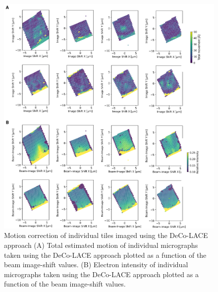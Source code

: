 \documentclass[
]{article}
\newenvironment{fignos:tagged-figure}[1][]{
    \let\oldthefigure\thefigure
    \let\oldtheHfigure\theHfigure
    \renewcommand{\thefigure}{#1}
    \renewcommand{\theHfigure}{#1}
  }{
    \let\thefigure\oldthefigure
    \let\theHfigure\oldtheHfigure
    \addtocounter{figure}{-1}
  }
\begin{document}
\begin{fignos:tagged-figure}

\begin{figure}
\hypertarget{fig:lamella_motion_thickness}{%
\centering
\includegraphics{figures/lamella_motion_thickness.png}
\caption{Motion correction of individual tiles imaged using the DeCo-LACE approach
(A) Total estimated motion of individual micrographs taken using the DeCo-LACE approach
plotted as a function of the beam image-shift values.
(B) Electron intensity of individual micrographs taken using the DeCo-LACE approach
plotted as a function of the beam image-shift values.}\label{fig:lamella_motion_thickness}
}
\end{figure}

\end{fignos:tagged-figure}
\end{document}
